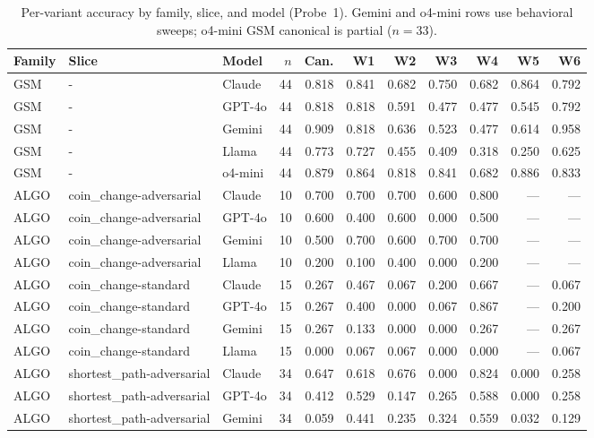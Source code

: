 \begin{table}[t]
\centering
\small
\caption{Per-variant accuracy by family, slice, and model (Probe~1). Gemini and o4-mini rows use behavioral sweeps; o4-mini GSM canonical is partial ($n{=}33$).}
\label{tab:appendix-c-var}
\begin{tabular}{lllr*{7}{r}}
\toprule
Family & Slice & Model & $n$ & Can. & W1 & W2 & W3 & W4 & W5 & W6 \\
\midrule
GSM & - & Claude & 44 & 0.818 & 0.841 & 0.682 & 0.750 & 0.682 & 0.864 & 0.792 \\
GSM & - & GPT-4o & 44 & 0.818 & 0.818 & 0.591 & 0.477 & 0.477 & 0.545 & 0.792 \\
GSM & - & Gemini & 44 & 0.909 & 0.818 & 0.636 & 0.523 & 0.477 & 0.614 & 0.958 \\
GSM & - & Llama & 44 & 0.773 & 0.727 & 0.455 & 0.409 & 0.318 & 0.250 & 0.625 \\
GSM & - & o4-mini & 44 & 0.879 & 0.864 & 0.818 & 0.841 & 0.682 & 0.886 & 0.833 \\
\midrule
ALGO & coin_change-adversarial & Claude & 10 & 0.700 & 0.700 & 0.700 & 0.600 & 0.800 & --- & --- \\
ALGO & coin_change-adversarial & GPT-4o & 10 & 0.600 & 0.400 & 0.600 & 0.000 & 0.500 & --- & --- \\
ALGO & coin_change-adversarial & Gemini & 10 & 0.500 & 0.700 & 0.600 & 0.700 & 0.700 & --- & --- \\
ALGO & coin_change-adversarial & Llama & 10 & 0.200 & 0.100 & 0.400 & 0.000 & 0.200 & --- & --- \\
ALGO & coin_change-standard & Claude & 15 & 0.267 & 0.467 & 0.067 & 0.200 & 0.667 & --- & 0.067 \\
ALGO & coin_change-standard & GPT-4o & 15 & 0.267 & 0.400 & 0.000 & 0.067 & 0.867 & --- & 0.200 \\
ALGO & coin_change-standard & Gemini & 15 & 0.267 & 0.133 & 0.000 & 0.000 & 0.267 & --- & 0.267 \\
ALGO & coin_change-standard & Llama & 15 & 0.000 & 0.067 & 0.067 & 0.000 & 0.000 & --- & 0.067 \\
ALGO & shortest_path-adversarial & Claude & 34 & 0.647 & 0.618 & 0.676 & 0.000 & 0.824 & 0.000 & 0.258 \\
ALGO & shortest_path-adversarial & GPT-4o & 34 & 0.412 & 0.529 & 0.147 & 0.265 & 0.588 & 0.000 & 0.258 \\
ALGO & shortest_path-adversarial & Gemini & 34 & 0.059 & 0.441 & 0.235 & 0.324 & 0.559 & 0.032 & 0.129 \\

\end{tabular}
\end{table}
